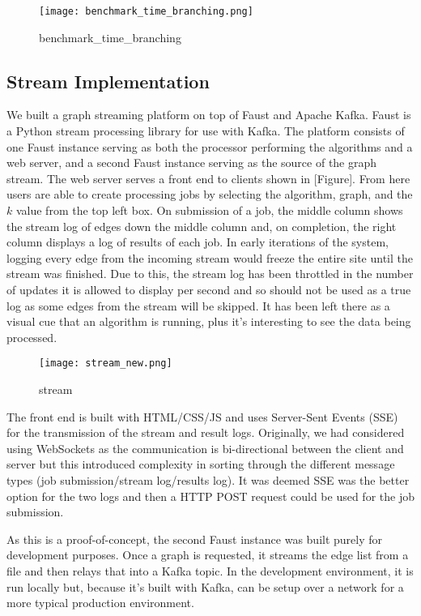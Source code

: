 \begin{figure}[h]
    \centering
    \texttt{[image: benchmark\_time\_branching.png]}
    \caption{benchmark\_time\_branching}
\end{figure}

\subsection{Stream Implementation}

We built a graph streaming platform on top of Faust and Apache Kafka.
Faust is a Python stream processing library for use with Kafka. The
platform consists of one Faust instance serving as both the processor
performing the algorithms and a web server, and a second Faust instance
serving as the source of the graph stream. The web server serves a front
end to clients shown in {[}Figure{]}. From here users are able to create
processing jobs by selecting the algorithm, graph, and the \(k\) value
from the top left box. On submission of a job, the middle column shows
the stream log of edges down the middle column and, on completion, the
right column displays a log of results of each job. In early iterations
of the system, logging every edge from the incoming stream would freeze
the entire site until the stream was finished. Due to this, the stream
log has been throttled in the number of updates it is allowed to display
per second and so should not be used as a true log as some edges from
the stream will be skipped. It has been left there as a visual cue that
an algorithm is running, plus it's interesting to see the data being
processed.

\begin{figure}[h]
    \centering
    \texttt{[image: stream\_new.png]}
    \caption{stream}
\end{figure}

The front end is built with HTML/CSS/JS and uses Server-Sent Events
(SSE) for the transmission of the stream and result logs. Originally, we
had considered using WebSockets as the communication is bi-directional
between the client and server but this introduced complexity in sorting
through the different message types (job submission/stream log/results
log). It was deemed SSE was the better option for the two logs and then
a HTTP POST request could be used for the job submission.

As this is a proof-of-concept, the second Faust instance was built
purely for development purposes. Once a graph is requested, it streams
the edge list from a file and then relays that into a Kafka topic. In
the development environment, it is run locally but, because it's built
with Kafka, can be setup over a network for a more typical production
environment.

